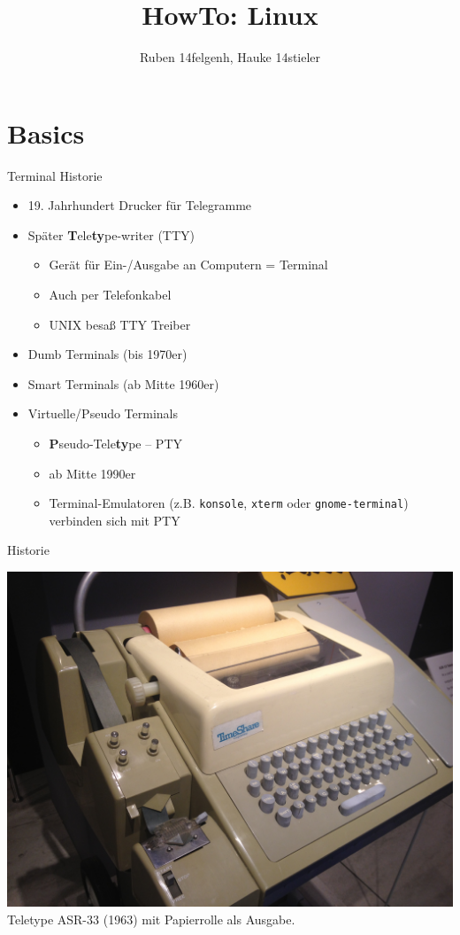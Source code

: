 \documentclass[compress]{beamer}
\title{HowTo: Linux}
\author{Ruben 14felgenh, Hauke 14stieler}
\date{\protect\displaydate{datex}}
\begin{document}
    \begin{frame}
        \titlepage
    \end{frame}

\section{Basics}

\begin{frame}{Terminal Historie}
    \begin{itemize}
        \item 19. Jahrhundert Drucker für Telegramme
        \item Später \textbf{T}ele\textbf{ty}pe-writer (TTY)
        \begin{itemize}
        	\item Gerät für Ein-/Ausgabe an Computern = Terminal
            \item Auch per Telefonkabel
            \item UNIX besaß TTY Treiber
        \end{itemize}
        \item Dumb Terminals (bis 1970er)
        \item Smart Terminals (ab Mitte 1960er)
        \item Virtuelle/Pseudo Terminals
        \begin{itemize}
        	\item \textbf{P}seudo-Tele\textbf{ty}pe -- PTY
        	\item ab Mitte 1990er
        	\item Terminal-Emulatoren (z.B. \texttt{konsole}, \texttt{xterm} oder \texttt{gnome-terminal}) verbinden sich mit PTY
        \end{itemize}
    \end{itemize}
\end{frame}


\begin{frame}{Historie}
	\begin{center}
		\includegraphics[height=0.7\textheight]{tty}
		\\
		Teletype ASR-33 (1963) mit Papierrolle als Ausgabe.
	\end{center}
\end{frame}
\end{document}
